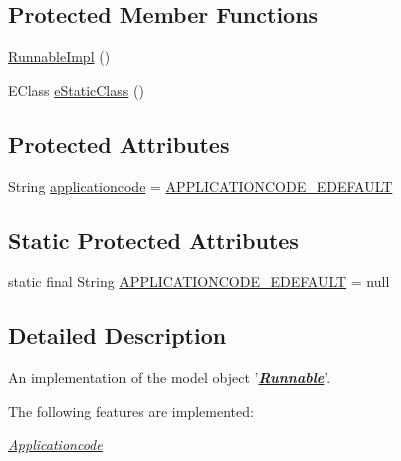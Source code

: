 \subsection*{Protected Member Functions}
\begin{DoxyCompactItemize}
\item 
\hyperlink{classshootingmachineemfmodel_1_1impl_1_1_runnable_impl_a0247593a94ce97a02105dfa9336d8b98}{Runnable\-Impl} ()
\item 
E\-Class \hyperlink{classshootingmachineemfmodel_1_1impl_1_1_runnable_impl_ab99f6c64c0fd9c0faa9a196037aba900}{e\-Static\-Class} ()
\end{DoxyCompactItemize}
\subsection*{Protected Attributes}
\begin{DoxyCompactItemize}
\item 
String \hyperlink{classshootingmachineemfmodel_1_1impl_1_1_runnable_impl_ab357bd0b340ee447e9f782027c416161}{applicationcode} = \hyperlink{classshootingmachineemfmodel_1_1impl_1_1_runnable_impl_a5cc1f2a8695f4d19623ada5c1eee8e42}{A\-P\-P\-L\-I\-C\-A\-T\-I\-O\-N\-C\-O\-D\-E\-\_\-\-E\-D\-E\-F\-A\-U\-L\-T}
\end{DoxyCompactItemize}
\subsection*{Static Protected Attributes}
\begin{DoxyCompactItemize}
\item 
static final String \hyperlink{classshootingmachineemfmodel_1_1impl_1_1_runnable_impl_a5cc1f2a8695f4d19623ada5c1eee8e42}{A\-P\-P\-L\-I\-C\-A\-T\-I\-O\-N\-C\-O\-D\-E\-\_\-\-E\-D\-E\-F\-A\-U\-L\-T} = null
\end{DoxyCompactItemize}


\subsection{Detailed Description}
An implementation of the model object '{\itshape {\bfseries \hyperlink{interfaceshootingmachineemfmodel_1_1_runnable}{Runnable}}}'.

The following features are implemented\-: 
\begin{DoxyItemize}
\item \hyperlink{classshootingmachineemfmodel_1_1impl_1_1_runnable_impl_a0c4ca1026ad6477d734cdb3ddcaee3c0}{{\itshape Applicationcode}} 
\end{DoxyItemize}

